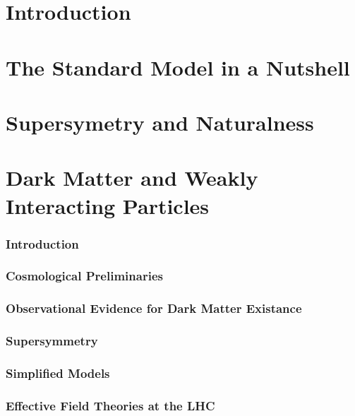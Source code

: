 \chapter{Introduction}
\chapter{The Standard Model in a Nutshell}
\chapter{Supersymetry and Naturalness}
\chapter{Dark Matter and Weakly Interacting Particles}
\subsection{Introduction}
\subsection{Cosmological Preliminaries}
\subsection{Observational Evidence for Dark Matter Existance}
\subsection{Supersymmetry}
\subsection{Simplified Models}
\subsection{Effective Field Theories at the LHC}

